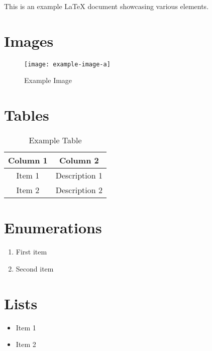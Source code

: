 \restoregeometry %

\clearpage
\tableofcontents

\clearpage
\listoffigures

\clearpage
\listoftables

\clearpage
\lstlistoflistings

\maketitle

This is an example LaTeX document showcasing various elements.

\section{Images}
\begin{figure}[h]
	\centering
	\texttt{[image: example-image-a]}
	\caption{Example Image}
	\label{fig:example}
\end{figure}

\section{Tables}
\begin{table}[h]
	\centering
	\begin{tabular}{|c|c|}
		\hline
		Column 1 & Column 2      \\
		\hline
		Item 1   & Description 1 \\
		Item 2   & Description 2 \\
		\hline
	\end{tabular}
	\caption{Example Table}
	\label{tab:example}
\end{table}

\section{Enumerations}
\begin{enumerate}
	\item First item
	\item Second item
\end{enumerate}

\section{Lists}
\begin{itemize}
	\item Item 1
	\item Item 2
\end{itemize}


